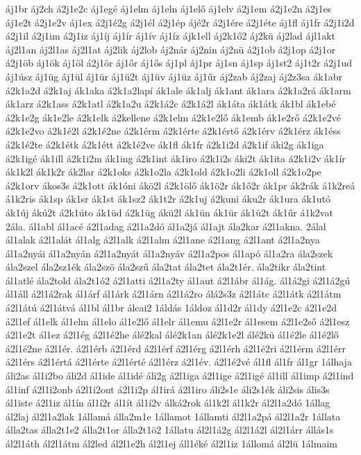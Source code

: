 {áj1br
áj2ch
á2j1e2c
áj1egé
áj1elm
áj1eln
áj1elő
áj1elv
á2j1em
á2j1e2n
á2j1es
áj1e2t
á2j1e2v
áj1ex
á2j1é2g
á2j1él
á2j1ép
ájé2r
á2j1ére
á2j1éte
áj1fl
áj1fr
á2j1i2d
á2j1il
á2j1im
á2j1iz
áj1íj
áj1ír
áj1ív
áj1íz
ájk1ell
áj2k1ő2
áj2kü
áj2lad
ájl1akt
áj2l1an
áj2l1as
áj2l1at
áj2lik
áj2lob
áj2nár
áj2nin
áj2nü
á2j1ob
á2j1op
á2j1or
á2j1öb
áj1ök
áj1öl
á2j1ör
áj1őr
áj1ős
áj1pl
áj1pr
áj1sn
áj1sp
áj1st2
áj1t2r
á2j1ud
áj1úsz
áj1üg
áj1ül
áj1ür
áj1ü2t
áj1üv
áj1üz
áj1űr
áj2zab
áj2zaj
áj2z3sa
ák1abr
á2k1a2d
á2k1aj
ák1aka
á2k1a2lapí
ák1ale
ák1alj
ák1ant
ák1ara
á2k1a2rá
ák1arm
ák1arz
á2k1ass
á2k1atl
á2k1a2u
á2k1á2c
á2k1á2l
ák1áta
ák1átk
ák1bl
ák1ebé
á2k1e2g
ák1e2le
á2k1elk
á2kellene
á2k1elm
á2k1e2lő
ák1emb
ák1e2rő
á2k1e2vé
á2k1e2vo
á2k1é2l
á2k1é2ne
á2k1érm
á2k1érte
á2k1értő
á2k1érv
á2k1érz
ák1éss
á2k1é2te
á2k1étk
á2k1étt
á2k1é2ve
ák1fl
ák1fr
á2k1i2d
á2k1if
áki2g
ák1iga
á2k1igé
ák1ill
á2k1i2m
ák1ing
á2k1int
ák1iro
á2k1i2s
áki2t
ák1ita
á2k1i2v
ák1ír
ák1k2l
ák1k2r
ák2lar
á2k1oks
á2k1o2la
á2k1old
á2k1o2li
á2k1oll
á2k1o2pe
á2k1orv
ákos3s
á2k1ott
ák1óni
ákö2l
á2k1ölő
ák1ö2r
ák1ő2r
ák1pr
ák2rák
á1k2reá
á1k2ris
ák1sp
ák1sr
ák1st
ák1sz2
ák1t2r
á2k1uj
á2kuni
áku2r
ák1ura
ák1utó
ák1új
ákú2t
á2k1úto
ák1üd
á2k1üg
ákü2l
ák1ün
ák1ür
ák1ü2t
ák1űr
á1k2vat
2ála.
ál1abl
ál1acé
á2l1adag
á2l1a2dó
ál1a2já
ál1ajt
ála2kar
á2l1akna.
2álal
ál1alak
á2l1alát
ál1alg
á2l1alk
á2l1alm
á2l1ane
á2l1ang
á2l1ant
á2l1a2nya
ál1a2nyái
ál1a2nyán
á2l1a2nyát
ál1a2nyáv
á2l1a2pos
ál1apó
ál1a2ra
ála2szek
ála2szel
ála2sz1ék
ála2szö
ála2szű
ála2tat
ála2tet
ála2t1ér.
ála2tikr
ála2tint
ál1atlé
ála2told
ála2t1ó2
á2l1atti
á2l1a2ty
ál1aut
á2l1ábr
ál1ág.
ál1á2gi
á2l1á2gú
ál1áll
á2l1á2rak
ál1árf
ál1árk
á2l1árn
á2l1á2ro
álá2s3z
á2l1átc
á2l1átk
á2l1átm
á2l1átú
á2l1átvá
ál1bl
ál1br
álcai2
1áldás
1áldoz
ál1d2r
ál1dy
á2l1e2c
á2l1e2d
á2l1ef
ál1elk
ál1elm
ál1elo
ál1e2lő
ál1elr
ál1emu
á2l1e2r
ál1esem
á2l1e2ső
á2l1esz
á2l1e2t
ál1ez
á2l1ég
á2l1é2he
álé2kal
álé2k1an
álé2k1e2l
álé2kü
ál1é2le
ál1é2lő
á2l1é2ne
á2l1ér.
á2l1érb
á2l1érd
á2l1érf
á2l1érg
á2l1érh
á2l1é2ri
á2l1érm
á2l1érr
á2l1érs
á2l1értá
á2l1érte
á2l1érté
á2l1érz
á2l1év.
á2l1é2vé
ál1fl
ál1fr
ál1gr
1álhaja
áli2as
ál1i2bo
áli2d
ál1ide
ál1idé
áli2g
á2l1iga
á2l1ige
á2l1igé
ál1ill
ál1imp
á2l1ind
ál1inf
á2l1i2onb
á2l1i2ont
á2l1i2p
ál1irá
á2l1iro
áli2s1e
áli2s1ék
áli2sis
ális3s
ál1iste
á2l1iz
ál1ín
ál1í2r
ál1ít
ál1í2v
álká2rok
ál1k2l
ál1k2r
ál2l1a2dó
1állag
ál2laj
ál2l1a2lak
1államá
álla2m1e
1államot
1államti
ál2l1a2pá
ál2l1a2r
1állata
álla2tas
álla2t1e2
álla2t1or
álla2t1ö2
1állatu
ál2l1á2g
ál2l1á2l
ál2l1árr
állás1s
ál2l1áth
ál2l1átm
ál2led
ál2l1e2h
ál2l1ej
áll1éké
ál2l1iz
1állomá
ál2lü
1álmaim
}
